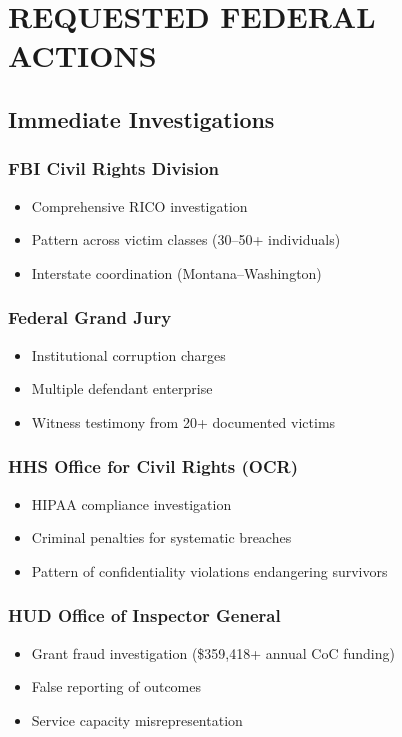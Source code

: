 \documentclass[11pt,letterpaper]{article}
\begin{document}
\newpage

\section{REQUESTED FEDERAL ACTIONS}

\subsection{Immediate Investigations}

\subsubsection{FBI Civil Rights Division}
\begin{itemize}[leftmargin=*]
\item Comprehensive RICO investigation
\item Pattern across victim classes (30--50+ individuals)
\item Interstate coordination (Montana--Washington)
\end{itemize}

\subsubsection{Federal Grand Jury}
\begin{itemize}[leftmargin=*]
\item Institutional corruption charges
\item Multiple defendant enterprise
\item Witness testimony from 20+ documented victims
\end{itemize}

\subsubsection{HHS Office for Civil Rights (OCR)}
\begin{itemize}[leftmargin=*]
\item HIPAA compliance investigation
\item Criminal penalties for systematic breaches
\item Pattern of confidentiality violations endangering survivors
\end{itemize}

\subsubsection{HUD Office of Inspector General}
\begin{itemize}[leftmargin=*]
\item Grant fraud investigation (\$359,418+ annual CoC funding)
\item False reporting of outcomes
\item Service capacity misrepresentation
\end{itemize}
\end{document}
